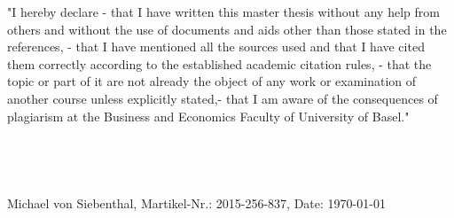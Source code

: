 
  "I hereby declare - that I have written this master thesis without any help 
  from others and without the use of documents and aids other than those stated 
  in the references, - that I have mentioned all the sources used and that I 
  have cited them correctly according to the established academic citation rules, 
  - that the topic or part of it are not already the object of any work or 
  examination of another course unless explicitly stated,- that I am aware of 
  the consequences of plagiarism at the Business and Economics Faculty of University of Basel."\\\\\\\\\\
  Michael von Siebenthal, Martikel-Nr.: 2015-256-837, Date: \today
